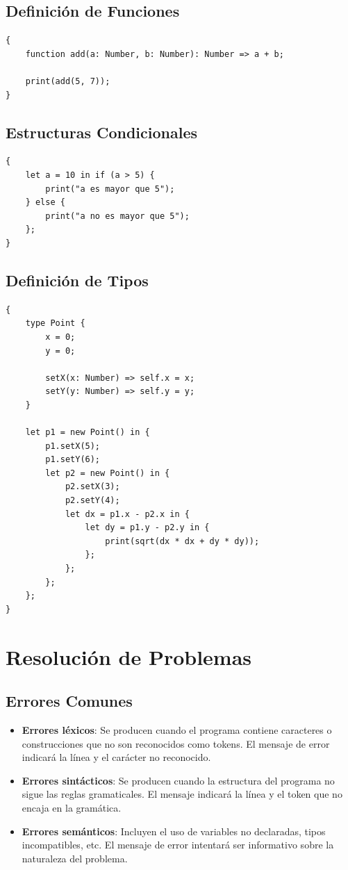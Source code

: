 \documentclass{article}
\begin{document}
\subsection{Definición de Funciones}
\begin{verbatim}
{    
    function add(a: Number, b: Number): Number => a + b;

    print(add(5, 7));
}
\end{verbatim}

\subsection{Estructuras Condicionales}
\begin{verbatim}
{
    let a = 10 in if (a > 5) {
        print("a es mayor que 5");
    } else {
        print("a no es mayor que 5");
    };
}
\end{verbatim}

\subsection{Definición de Tipos}
\begin{verbatim}
{
    type Point {
        x = 0;
        y = 0;

        setX(x: Number) => self.x = x;
        setY(y: Number) => self.y = y;
    }

    let p1 = new Point() in {
        p1.setX(5);
        p1.setY(6);
        let p2 = new Point() in {
            p2.setX(3);
            p2.setY(4);
            let dx = p1.x - p2.x in {
                let dy = p1.y - p2.y in {
                    print(sqrt(dx * dx + dy * dy));
                };
            };
        };
    };  
}
\end{verbatim}

\section{Resolución de Problemas}

\subsection{Errores Comunes}

\begin{itemize}
    \item \textbf{Errores léxicos}: Se producen cuando el programa contiene caracteres o construcciones que no son reconocidos como tokens. El mensaje de error indicará la línea y el carácter no reconocido.
    
    \item \textbf{Errores sintácticos}: Se producen cuando la estructura del programa no sigue las reglas gramaticales. El mensaje indicará la línea y el token que no encaja en la gramática.
    
    \item \textbf{Errores semánticos}: Incluyen el uso de variables no declaradas, tipos incompatibles, etc. El mensaje de error intentará ser informativo sobre la naturaleza del problema.
\end{itemize}
\end{document}
